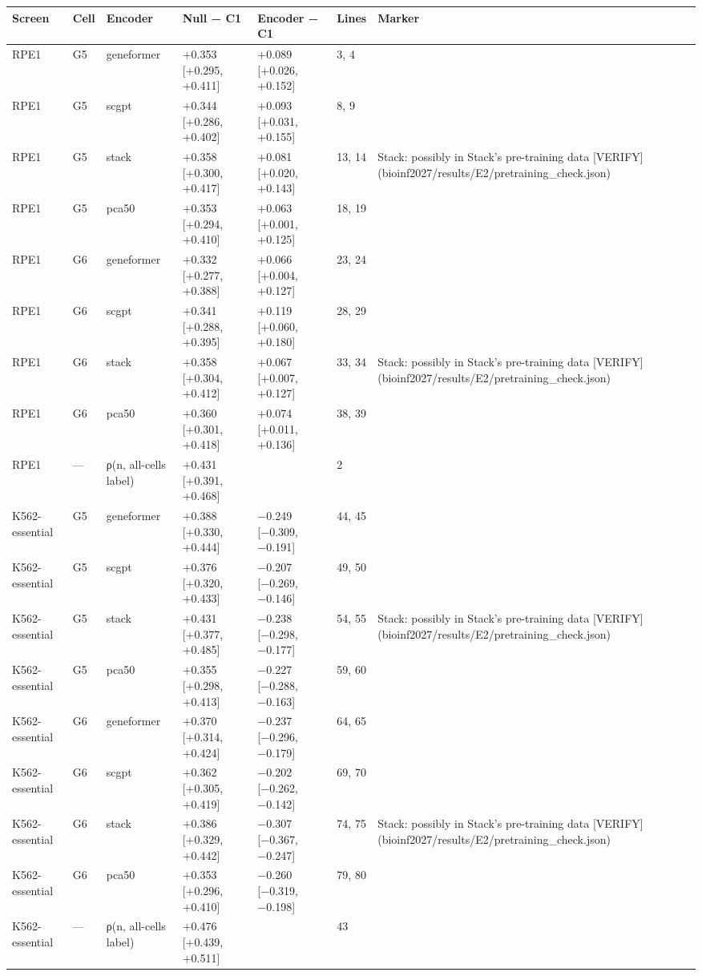 \begin{tabular}{lllllll}
\toprule
Screen & Cell & Encoder & Null − C1 & Encoder − C1 & Lines & Marker \\
\midrule
RPE1 & G5 & geneformer & +0.353 [+0.295, +0.411] & +0.089 [+0.026, +0.152] & 3, 4 &  \\
RPE1 & G5 & scgpt & +0.344 [+0.286, +0.402] & +0.093 [+0.031, +0.155] & 8, 9 &  \\
RPE1 & G5 & stack & +0.358 [+0.300, +0.417] & +0.081 [+0.020, +0.143] & 13, 14 & Stack: possibly in Stack's pre-training data [VERIFY] (bioinf2027/results/E2/pretraining\_check.json) \\
RPE1 & G5 & pca50 & +0.353 [+0.294, +0.410] & +0.063 [+0.001, +0.125] & 18, 19 &  \\
RPE1 & G6 & geneformer & +0.332 [+0.277, +0.388] & +0.066 [+0.004, +0.127] & 23, 24 &  \\
RPE1 & G6 & scgpt & +0.341 [+0.288, +0.395] & +0.119 [+0.060, +0.180] & 28, 29 &  \\
RPE1 & G6 & stack & +0.358 [+0.304, +0.412] & +0.067 [+0.007, +0.127] & 33, 34 & Stack: possibly in Stack's pre-training data [VERIFY] (bioinf2027/results/E2/pretraining\_check.json) \\
RPE1 & G6 & pca50 & +0.360 [+0.301, +0.418] & +0.074 [+0.011, +0.136] & 38, 39 &  \\
RPE1 & — & ρ(n, all-cells label) & +0.431 [+0.391, +0.468] &  & 2 &  \\
K562-essential & G5 & geneformer & +0.388 [+0.330, +0.444] & −0.249 [−0.309, −0.191] & 44, 45 &  \\
K562-essential & G5 & scgpt & +0.376 [+0.320, +0.433] & −0.207 [−0.269, −0.146] & 49, 50 &  \\
K562-essential & G5 & stack & +0.431 [+0.377, +0.485] & −0.238 [−0.298, −0.177] & 54, 55 & Stack: possibly in Stack's pre-training data [VERIFY] (bioinf2027/results/E2/pretraining\_check.json) \\
K562-essential & G5 & pca50 & +0.355 [+0.298, +0.413] & −0.227 [−0.288, −0.163] & 59, 60 &  \\
K562-essential & G6 & geneformer & +0.370 [+0.314, +0.424] & −0.237 [−0.296, −0.179] & 64, 65 &  \\
K562-essential & G6 & scgpt & +0.362 [+0.305, +0.419] & −0.202 [−0.262, −0.142] & 69, 70 &  \\
K562-essential & G6 & stack & +0.386 [+0.329, +0.442] & −0.307 [−0.367, −0.247] & 74, 75 & Stack: possibly in Stack's pre-training data [VERIFY] (bioinf2027/results/E2/pretraining\_check.json) \\
K562-essential & G6 & pca50 & +0.353 [+0.296, +0.410] & −0.260 [−0.319, −0.198] & 79, 80 &  \\
K562-essential & — & ρ(n, all-cells label) & +0.476 [+0.439, +0.511] &  & 43 &  \\
\bottomrule
\end{tabular}
